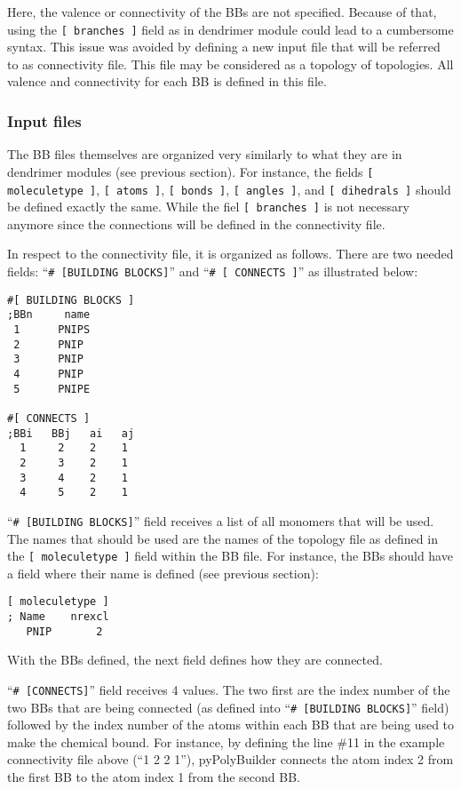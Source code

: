 \documentclass[12pt]{article}
\begin{document}
Here, the valence or connectivity of the BBs are not specified.
Because of that, using the \texttt{[ branches ]} field as in dendrimer module could lead to a cumbersome syntax.
This issue was avoided by defining a new input file that will be referred to as connectivity file.
This file may be considered as a topology of topologies.
All valence and connectivity for each BB is defined in this file.

\subsubsection{Input files}
\label{sec:GENinputFiles}

The BB files themselves are organized very similarly to what they are in dendrimer modules (see previous section).
For instance, the fields \texttt{[ moleculetype ]}, \texttt{[ atoms ]}, \texttt{[ bonds ]}, \texttt{[ angles ]}, and \texttt{[ dihedrals ]} should be defined exactly the same. 
While the fiel \texttt{[ branches ]} is not necessary anymore since the connections will be defined in the connectivity file.

In respect to the connectivity file, it is organized as follows.
There are two needed fields: ``\texttt{\# [BUILDING BLOCKS]}'' and ``\texttt{\# [ CONNECTS ]}'' as illustrated below:

\begin{lstlisting}
#[ BUILDING BLOCKS ]
;BBn     name
 1      PNIPS
 2      PNIP
 3      PNIP
 4      PNIP
 5      PNIPE

#[ CONNECTS ]
;BBi   BBj   ai   aj
  1     2    2    1
  2     3    2    1
  3     4    2    1
  4     5    2    1
\end{lstlisting}

``\texttt{\# [BUILDING BLOCKS]}'' field receives a list of all monomers that will be used.
The names that should be used are the names of the topology file as defined in the \texttt{[ moleculetype ]} field within the BB file.
For instance, the BBs should have a field where their name is defined (see previous section):
\begin{lstlisting}
[ moleculetype ]
; Name    nrexcl
   PNIP       2
\end{lstlisting}

With the BBs defined, the next field defines how they are connected.

``\texttt{\# [CONNECTS]}'' field receives 4 values.
The two first are the index number of the two BBs that are being connected (as defined into ``\texttt{\# [BUILDING BLOCKS]}'' field) followed by the index number of the atoms within each BB that are being used to make the chemical bound.
For instance, by defining the line \#11 in the example connectivity file above (``1   2   2    1''), pyPolyBuilder connects the atom index 2 from the first BB to the atom index 1 from the second BB.
\end{document}
